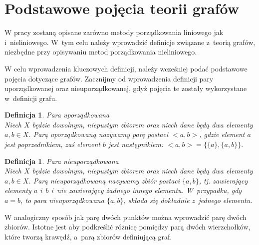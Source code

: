 \documentclass[12pt,a4paper]{report}
\newtheorem{definition}[theorem]{Definicja}
\begin{document}
\section{Podstawowe pojęcia teorii grafów}\label{grafy} %
W pracy zostaną opisane zarówno metody porządkowania liniowego jak i~nieliniowego. W~tym celu należy wprowadzić definicje związane z~teorią grafów, niezbędne przy opisywaniu metod porządkowania nieliniowego.


W celu wprowadzenia kluczowych definicji, należy wcześniej podać podstawowe pojęcia dotyczące grafów. Zacznijmy od wprowadzenia definicji pary uporządkowanej oraz nieuporządkowanej, gdyż pojęcia te zostały wykorzystane w~definicji grafu.



\begin{definition}{Para uporządkowana \cite[w oparciu o~rozdział 3]{kuratowski2004}}\\
Niech $X$ będzie dowolnym, niepustym zbiorem oraz niech dane będą dwa elementy $a,b \in X$. Parą uporządkowaną nazywamy parę postaci $<a,b>$, gdzie element $a$ jest poprzednikiem, zaś element $b$ jest następnikiem: $<a,b>=\{\{a\},\{a,b\}\}.$
\end{definition}

\begin{definition}{Para nieuporządkowana \cite[w oparciu o~rozdział 3]{kuratowski2004}}\\
Niech $X$ będzie dowolnym, niepustym zbiorem oraz niech dane będą dwa elementy $a,b \in X$. Parą nieuporządkowaną nazywamy zbiór postaci $\{a,b\}$, tj. zawierający elementy $a$ i~$b$ i~nie zawierający żadnego innego elementu. W~przypadku, gdy $a=b$, to para nieuporządkowana $\{a,b\}$, składa się dokładnie z~jednego elementu.
\end{definition}

W analogiczny sposób jak parę dwóch punktów można wprowadzić parę dwóch zbiorów. Istotne jest aby podkreślić różnicę pomiędzy parą dwóch wierzchołków, które tworzą krawędź, a~parą zbiorów definiującą graf. 
\end{document}
